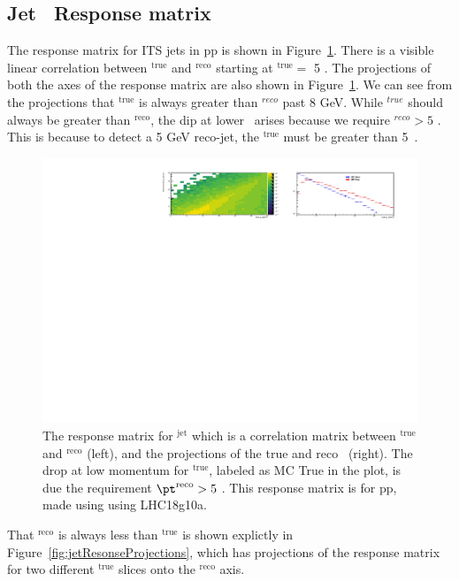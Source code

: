 \subsection{Jet \pt~Response matrix}
The response matrix for ITS jets in pp is shown in Figure~\ref{fig:jetResponseMatrix}. There is a visible linear correlation between \pt$^{\mathrm{true}}$ and \pt$^{\mathrm{reco}}$ starting at {\pt$^{\mathrm{true}} =$ 5 \GeVc}. The projections of both the axes of the response matrix are also shown in Figure~\ref{fig:jetResponseMatrix}. We can see from the projections that \pt$^{\mathrm{true}}$ is always greater than \pt$^{reco}$ past 8 GeV. While \pt$^{true}$ should always be greater than \pt$^{\mathrm{reco}}$, the dip at lower \pt~arises because we require \pt$^{reco} > 5$ \GeVc. This is because to detect a 5 GeV reco-jet, the \pt$^{\mathrm{true}}$ must be greater than 5~\GeVc. 
\begin{figure}[h]
\center
\includegraphics[height=0.5\textwidth,width=\textwidth]{JetResponse/Matrix_jets_its_pp.pdf}
\caption{The response matrix for \pt$^{\mathrm{jet}}$ which is a correlation matrix between \pt$^{\mathrm{true}}$ and \pt$^{\mathrm{reco}}$ (left), and the projections of the true and reco \pt~(right). The drop at low momentum for \pt$^{\mathrm{true}}$, labeled as MC True in the plot, is due the requirement $\pt^{\mathrm{reco}} > 5$ \GeVc. This response matrix is for pp, made using using LHC18g10a.} 
\label{fig:jetResponseMatrix}
\end{figure}
That \pt$^{\mathrm{reco}}$ is always less than \pt$^{\mathrm{true}}$ is shown explictly in Figure~\ref{fig:jetResonseProjections}, which has projections of the response matrix for two different \pt$^{\mathrm{true}}$ slices onto the \pt$^{\mathrm{reco}}$ axis.
